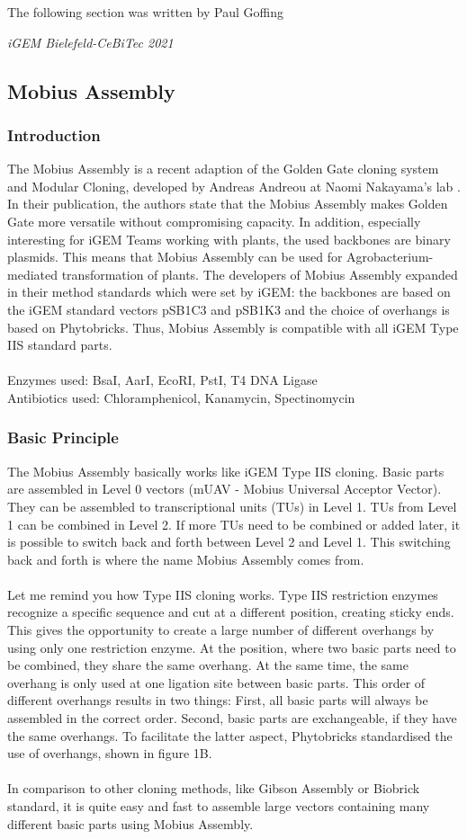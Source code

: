 \epigraph{The following section was written by Paul Goffing}{\textit{iGEM Bielefeld-CeBiTec 2021}}
\subsection{Mobius Assembly}
\subsubsection{Introduction}
The Mobius Assembly is a recent adaption of the Golden Gate cloning system and Modular Cloning, developed by Andreas Andreou at Naomi Nakayama’s lab \parencite{Andreou2018}. In their publication, the authors state that the Mobius Assembly makes Golden Gate more versatile without compromising capacity. In addition, especially interesting for iGEM Teams working with plants, the used backbones are binary plasmids. This means that Mobius Assembly can be used for Agrobacterium-mediated transformation of plants. The developers of Mobius Assembly expanded in their method standards which were set by iGEM: the backbones are based on the iGEM standard vectors pSB1C3 and pSB1K3 and the choice of overhangs is based on Phytobricks. Thus, Mobius Assembly is compatible with all iGEM Type IIS standard parts.\\ \\
Enzymes used: BsaI, AarI, EcoRI, PstI, T4 DNA Ligase \\
Antibiotics used: Chloramphenicol, Kanamycin, Spectinomycin
\subsubsection{Basic Principle}
The Mobius Assembly basically works like iGEM Type IIS cloning. Basic parts are assembled in Level 0 vectors (mUAV - Mobius Universal Acceptor Vector). They can be assembled to transcriptional units (TUs) in Level 1. TUs from Level 1 can be combined in Level 2. If more TUs need to be combined or added later, it is possible to switch back and forth between Level 2 and Level 1. This switching back and forth is where the name Mobius Assembly comes from. \\ \\
Let me remind you how Type IIS cloning works. Type IIS restriction enzymes recognize a specific sequence and cut at a different position, creating sticky ends. This gives the opportunity to create a large number of different overhangs by using only one restriction enzyme. At the position, where two basic parts need to be combined, they share the same overhang. At the same time, the same overhang is only used at one ligation site between basic parts. This order of different overhangs results in two things: First, all basic parts will always be assembled in the correct order. Second, basic parts are exchangeable, if they have the same overhangs. To facilitate the latter aspect, Phytobricks standardised the use of overhangs, shown in figure 1B. \\ \\
In comparison to other cloning methods, like Gibson Assembly or Biobrick standard, it is quite easy and fast to assemble large vectors containing many different basic parts using Mobius Assembly.
